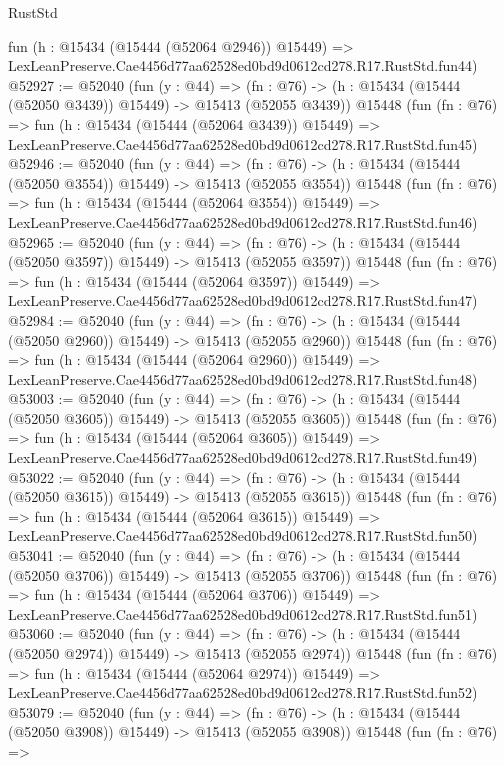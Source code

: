 \begin{lexlean}{RustStd}
\begin{coremodule}
    fun (h : @15434 (@15444 (@52064 @2946)) @15449) =>
    LexLeanPreserve.Cae4456d77aa62528ed0bd9d0612cd278.R17.RustStd.fun44)
@52927 := @52040
    (fun (y : @44) =>
    (fn : @76) -> (h : @15434 (@15444 (@52050 @3439)) @15449) -> @15413 (@52055 @3439))
    @15448
    (fun (fn : @76) =>
    fun (h : @15434 (@15444 (@52064 @3439)) @15449) =>
    LexLeanPreserve.Cae4456d77aa62528ed0bd9d0612cd278.R17.RustStd.fun45)
@52946 := @52040
    (fun (y : @44) =>
    (fn : @76) -> (h : @15434 (@15444 (@52050 @3554)) @15449) -> @15413 (@52055 @3554))
    @15448
    (fun (fn : @76) =>
    fun (h : @15434 (@15444 (@52064 @3554)) @15449) =>
    LexLeanPreserve.Cae4456d77aa62528ed0bd9d0612cd278.R17.RustStd.fun46)
@52965 := @52040
    (fun (y : @44) =>
    (fn : @76) -> (h : @15434 (@15444 (@52050 @3597)) @15449) -> @15413 (@52055 @3597))
    @15448
    (fun (fn : @76) =>
    fun (h : @15434 (@15444 (@52064 @3597)) @15449) =>
    LexLeanPreserve.Cae4456d77aa62528ed0bd9d0612cd278.R17.RustStd.fun47)
@52984 := @52040
    (fun (y : @44) =>
    (fn : @76) -> (h : @15434 (@15444 (@52050 @2960)) @15449) -> @15413 (@52055 @2960))
    @15448
    (fun (fn : @76) =>
    fun (h : @15434 (@15444 (@52064 @2960)) @15449) =>
    LexLeanPreserve.Cae4456d77aa62528ed0bd9d0612cd278.R17.RustStd.fun48)
@53003 := @52040
    (fun (y : @44) =>
    (fn : @76) -> (h : @15434 (@15444 (@52050 @3605)) @15449) -> @15413 (@52055 @3605))
    @15448
    (fun (fn : @76) =>
    fun (h : @15434 (@15444 (@52064 @3605)) @15449) =>
    LexLeanPreserve.Cae4456d77aa62528ed0bd9d0612cd278.R17.RustStd.fun49)
@53022 := @52040
    (fun (y : @44) =>
    (fn : @76) -> (h : @15434 (@15444 (@52050 @3615)) @15449) -> @15413 (@52055 @3615))
    @15448
    (fun (fn : @76) =>
    fun (h : @15434 (@15444 (@52064 @3615)) @15449) =>
    LexLeanPreserve.Cae4456d77aa62528ed0bd9d0612cd278.R17.RustStd.fun50)
@53041 := @52040
    (fun (y : @44) =>
    (fn : @76) -> (h : @15434 (@15444 (@52050 @3706)) @15449) -> @15413 (@52055 @3706))
    @15448
    (fun (fn : @76) =>
    fun (h : @15434 (@15444 (@52064 @3706)) @15449) =>
    LexLeanPreserve.Cae4456d77aa62528ed0bd9d0612cd278.R17.RustStd.fun51)
@53060 := @52040
    (fun (y : @44) =>
    (fn : @76) -> (h : @15434 (@15444 (@52050 @2974)) @15449) -> @15413 (@52055 @2974))
    @15448
    (fun (fn : @76) =>
    fun (h : @15434 (@15444 (@52064 @2974)) @15449) =>
    LexLeanPreserve.Cae4456d77aa62528ed0bd9d0612cd278.R17.RustStd.fun52)
@53079 := @52040
    (fun (y : @44) =>
    (fn : @76) -> (h : @15434 (@15444 (@52050 @3908)) @15449) -> @15413 (@52055 @3908))
    @15448
    (fun (fn : @76) =>

\end{coremodule}
\end{lexlean}
